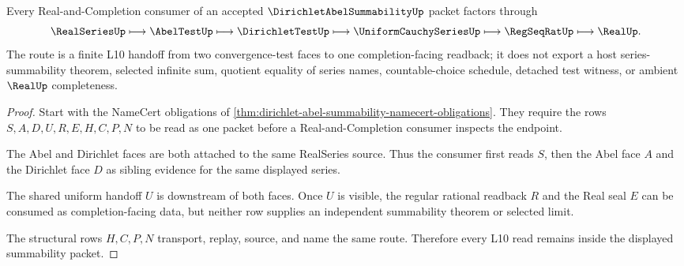 \begin{theorem}
\label{thm:dirichlet-abel-summability-l10-handoff}
Every Real-and-Completion consumer of an accepted $\DirichletAbelSummabilityUp$ packet factors through
$$
\RealSeriesUp \longmapsto \AbelTestUp \longmapsto \DirichletTestUp \longmapsto \UniformCauchySeriesUp \longmapsto \RegSeqRatUp \longmapsto \RealUp .
$$
The route is a finite L10 handoff from two convergence-test faces to one completion-facing readback; it does not export a host series-summability theorem, selected infinite sum, quotient equality of series names, countable-choice schedule, detached test witness, or ambient $\RealUp$ completeness.
\end{theorem}
\begin{proof}
Start with the NameCert obligations of \autoref{thm:dirichlet-abel-summability-namecert-obligations}. They require the rows $S,A,D,U,R,E,H,C,P,N$ to be read as one packet before a Real-and-Completion consumer inspects the endpoint.

The Abel and Dirichlet faces are both attached to the same RealSeries source. Thus the consumer first reads $S$, then the Abel face $A$ and the Dirichlet face $D$ as sibling evidence for the same displayed series.

The shared uniform handoff $U$ is downstream of both faces. Once $U$ is visible, the regular rational readback $R$ and the Real seal $E$ can be consumed as completion-facing data, but neither row supplies an independent summability theorem or selected limit.

The structural rows $H,C,P,N$ transport, replay, source, and name the same route. Therefore every L10 read remains inside the displayed summability packet.
\end{proof}



